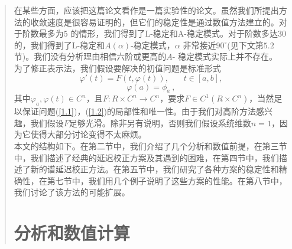 \documentclass{article}
\begin{document}
\begin{CJK}{UTF8}{gkai}
\begin{quotation}
在某些方面，应该把这篇论文看作是一篇实验性的论文。虽然我们所提出方法的收敛速度是很容易证明的，但它们的稳定性是通过数值方法建立的。对于阶数最多为$5$ 的情形，我们得到了L-稳定和A-稳定模式。对于阶数多达$30$ 的，我们得到了L-稳定和$A(\alpha)$-稳定模式，$\alpha$ 非常接近$90^{\circ}$(见下文第$5.2$节)。我们没有分析理由相信六阶或更高的$A$- 稳定模式实际上并不存在。\\
为了修正表示法，我们假设要解决的初值问题是标准形式\\
\begin{equation}
\label{1.1}
\varphi '(t) = F(t,\varphi (t)),~~~~~~~~t \in [a,b],
\end{equation}
\begin{equation}
\label{1.2}
\varphi(a) = \phi_{a}~,
\end{equation}
其中$\varphi_{a},\varphi(t) \in C^n$，且$F:R \times C^n \rightarrow C^n$，要求$F \in C^1(R \times C^n)$，当然足以保证问题(\ref{1.1})，(\ref{1.2})的局部性和唯一性。由于我们对高阶方法感兴趣，我们假设$F$足够光滑。除非另有说明，否则我们假设系统维数$n=1$，因为它使得大部分讨论变得不太麻烦。\\

本文的结构如下。在第二节中，我们介绍了几个分析和数值前提，在第三节中，我们描述了经典的延迟校正方案及其遇到的困难，在第四节中，我们描述了新的谱延迟校正方法。在第五节中，我们研究了各种方案的稳定性和精确性，在第七节中，我们用几个例子说明了这些方案的性能。在第八节中，我们讨论了该方法的可能扩展。\\
\section{分析和数值计算}


\end{quotation}
\end{CJK}
\end{document}
